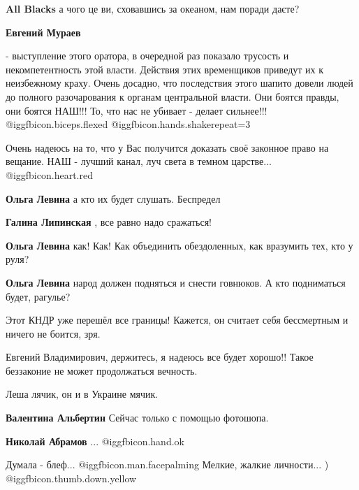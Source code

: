 \begin{itemize}
\begin{itemize}
\textbf{All Blacks} а чого це ви, сховавшись за океаном, нам поради даєте?
\end{itemize} %

\textbf{Евгений Мураев} 

- выступление этого оратора, в очередной раз показало трусость и
некомпетентность этой власти. Действия этих временщиков приведут их к
неизбежному краху. Очень досадно, что последствия этого шапито довели людей до
полного разочарования к органам центральной власти. Они боятся правды, они
боятся НАШ!!! То, что нас не убивает - делает сильнее!!!
@igg{fbicon.biceps.flexed}  @igg{fbicon.hands.shake}{repeat=3} 


Очень надеюсь на то, что у Вас получится доказать своё законное право на
вещание. НАШ - лучший канал, луч света в темном царстве... @igg{fbicon.heart.red}

\begin{itemize} %
\textbf{Ольга Левина} а кто их будет слушать. Беспредел

\textbf{Галина Липинская} , все равно надо сражаться!

\textbf{Ольга Левина} как! Как! Как объединить обездоленных, как вразумить тех, кто у руля?

\textbf{Ольга Левина} народ должен подняться и снести говнюков.
А кто подниматься будет, рагулье?
\end{itemize} %


Этот КНДР уже перешёл все границы! Кажется, он считает себя бессмертным и
ничего не боится, зря.

Евгений Владимирович, держитесь, я надеюсь все будет хорошо!! Такое беззаконие
не может продолжаться вечность.

Леша лячик, он и в Украине мячик.

\begin{itemize} %
\textbf{Валентина Альбертин} Сейчас только с помощью фотошопа.

\textbf{Николай Абрамов} ... @igg{fbicon.hand.ok} 
\end{itemize} %

Думала - блеф... @igg{fbicon.man.facepalming}  Мелкие, жалкие личности... ) @igg{fbicon.thumb.down.yellow} 


\end{itemize}
